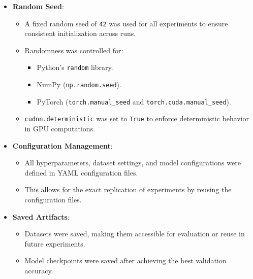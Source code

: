\begin{itemize}
    \item \textbf{Random Seed}: 
    \begin{itemize}
        \item A fixed random seed of \texttt{42} was used for all experiments to ensure consistent initialization across runs.
        \item Randomness was controlled for:
        \begin{itemize}
            \item Python's \texttt{random} library.
            \item NumPy (\texttt{np.random.seed}).
            \item PyTorch (\texttt{torch.manual\_seed} and \texttt{torch.cuda.manual\_seed}).
        \end{itemize}
        \item \texttt{cudnn.deterministic} was set to \texttt{True} to enforce deterministic behavior in GPU computations.
    \end{itemize}
    \item \textbf{Configuration Management}:
    \begin{itemize}
        \item All hyperparameters, dataset settings, and model configurations were defined in YAML configuration files.
        \item This allows for the exact replication of experiments by reusing the configuration files.
    \end{itemize}
    \item \textbf{Saved Artifacts}:
    \begin{itemize}
        \item Datasets were saved, making them accessible for evaluation or reuse in future experiments.
        \item Model checkpoints were saved after achieving the best validation accuracy.
    \end{itemize}
\end{itemize}

